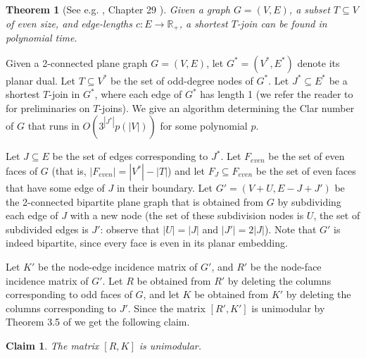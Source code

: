 \documentclass{article}
\newcommand{\Rset}{\mathbb{R}}
\newtheorem{theorem}{Theorem}
\newtheorem{claim}{Claim}
\begin{document}
\begin{theorem}[See e.g. \cite{lexbook}, Chapter 29 ]
Given a graph $G=(V, E)$, a subset $T\subseteq V$ of even size, and edge-lengths $c:E\to \Rset_+$, a shortest $T$-join can be found in polynomial time.
\end{theorem}





Given a 2-connected plane graph $G=(V,E)$, let $G^*=(V^*, E^*)$ denote
its planar dual. Let $T\subseteq V^*$ be the set of odd-degree nodes
of $G^*$. Let $J^*\subseteq E^*$ be a shortest $T$-join in $G^*$,
where each edge of $G^*$ has length 1 (we refer the reader to \cite[Chapter 29]{lexbook} for preliminaries on $T$-joins). We give an algorithm
determining the Clar number of $G$ that runs in $O(3^{|J^*|}p(|V|))$ for some polynomial $p$.


\newcommand{\Feven}{\ensuremath{F_{even}}}

Let $J\subseteq E$ be the set of edges corresponding to
  $J^*$. Let $\Feven$ be the set of even faces of $G$ (that is,
  $|\Feven|= |V^*|-|T|$) and let $F_J\subseteq \Feven $ be the set of
  even faces that have some edge of $J$ in their boundary.
 Let $G'=(V+U, E - J + J')$ be the 2-connected bipartite plane
  graph that is obtained from $G$ by subdividing each edge of $J$ with
  a new node (the set of these subdivision nodes is $U$, the set of
  subdivided edges is $J'$: observe that $|U|=|J|$ and $|J'|=2|J|$). Note that $G'$ is indeed bipartite, since every face is even in its planar embedding. 

Let $K'$ be the node-edge incidence matrix of $G'$, and $R'$ be the
node-face incidence matrix of $G'$. Let $R$ be obtained from $R'$ by
deleting the columns corresponding to odd faces of $G$, and let $K$ be
obtained from $K'$ by deleting the columns corresponding to $J'$. Since the matrix $[R',K']$ is unimodular by Theorem  3.5 of \cite{abeledo2007unimodularity} we get the following claim.

\begin{claim} \label{cl:unimod}
The matrix $[R,K]$ is unimodular.
\end{claim}
\end{document}
